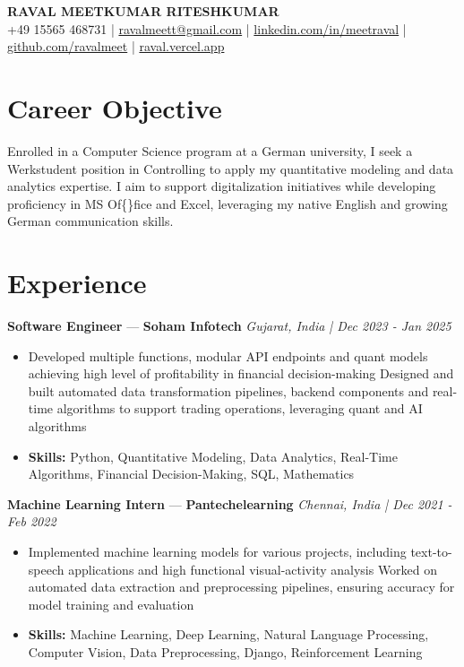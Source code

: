 \documentclass[a4paper,10pt]{article}
\begin{document}
\begin{center}
  {\Large\bfseries RAVAL MEETKUMAR RITESHKUMAR}\\[2pt]
  {\small +49 15565 468731 \;|\; \href{mailto:ravalmeett@gmail.com}{ravalmeett@gmail.com} \;|\; \href{https://www.linkedin.com/in/meetraval/}{linkedin.com/in/meetraval} \;|\; \href{https://github.com/ravalmeet}{github.com/ravalmeet} \;|\; \href{https://raval.vercel.app/}{raval.vercel.app}}
\end{center}
\vspace{-3pt}

\section*{Career Objective}
Enrolled in a Computer Science program at a German university, I seek a Werkstudent position in Controlling to apply my quantitative modeling and data analytics expertise. I aim to support digitalization initiatives while developing proficiency in MS Of\{\}fice and Excel, leveraging my native English and growing German communication skills.\par

\section*{Experience}
\textbf{Software Engineer} — \textbf{Soham Infotech} \hfill \textit{Gujarat, India \;|\; Dec 2023 - Jan 2025}\par
\vspace{1pt}
\begin{itemize}
  \item Developed multiple functions, modular API endpoints and quant models achieving high level of profitability in financial decision-making Designed and built automated data transformation pipelines, backend components and real-time algorithms to support trading operations, leveraging quant and AI algorithms
  \item \textbf{Skills:} Python, Quantitative Modeling, Data Analytics, Real-Time Algorithms, Financial Decision-Making, SQL, Mathematics
\end{itemize}
\vspace{3pt}
\textbf{Machine Learning Intern} — \textbf{Pantechelearning} \hfill \textit{Chennai, India \;|\; Dec 2021 - Feb 2022}\par
\vspace{1pt}
\begin{itemize}
  \item Implemented machine learning models for various projects, including text-to-speech applications and high functional visual-activity analysis Worked on automated data extraction and preprocessing pipelines, ensuring accuracy for model training and evaluation
  \item \textbf{Skills:} Machine Learning, Deep Learning, Natural Language Processing, Computer Vision, Data Preprocessing, Django, Reinforcement Learning
\end{itemize}
\end{document}

